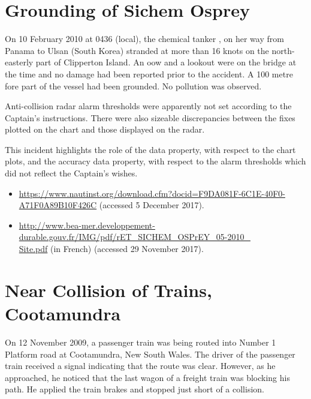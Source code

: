 \section{Grounding of Sichem Osprey} \label{bkm:incacc:sichemosprey}
On 10 February 2010 at 0436 (local), the chemical tanker , on her way from Panama to Ulsan (South Korea) stranded at more than 16 knots on the north-easterly part of Clipperton Island. An \gls{oow} and a lookout were on the bridge at the time and no damage had been reported prior to the accident. A 100 metre fore part of the vessel had been grounded. No pollution was observed.

Anti-collision radar alarm thresholds were apparently not set according to the Captain's instructions. There were also sizeable discrepancies between the fixes plotted on the chart and those displayed on the radar.

This incident highlights the role of the  \gls{data property}, with respect to the chart plots, and the \gls{accuracy} \gls{data property}, with respect to the alarm thresholds which did not reflect the Captain's wishes.

\begin{samepage}
\begin{itemize}
	\item \raggedright{\href{https://www.nautinst.org/download.cfm?docid=F9DA081F-6C1E-40F0-A71F0A89B10F426C}{https://www.nautinst.org/download.cfm?docid=F9DA081F-6C1E-40F0-A71F0A89B10F426C} (accessed 5 December 2017).}
  \item \raggedright{\href{http://www.bea-mer.developpement-durable.gouv.fr/IMG/pdf/rET_SICHEM_OSPrEY_05-2010_Site.pdf}{http://www.bea-mer.developpement-durable.gouv.fr/IMG/pdf/rET\_SICHEM\_OSPrEY\_05-2010\_\\Site.pdf} (in French) (accessed 29 November 2017).}
\end{itemize}
\end{samepage}


\section{Near Collision of Trains, Cootamundra} \label{bkm:incacc:cootamundra}
On 12 November 2009, a passenger train was being routed into Number 1 Platform road at Cootamundra, New South Wales. The driver of the passenger train received a signal indicating that the route was clear. However, as he approached, he noticed that the last wagon of a freight train was blocking his path. He applied the train brakes and stopped just short of a collision.

